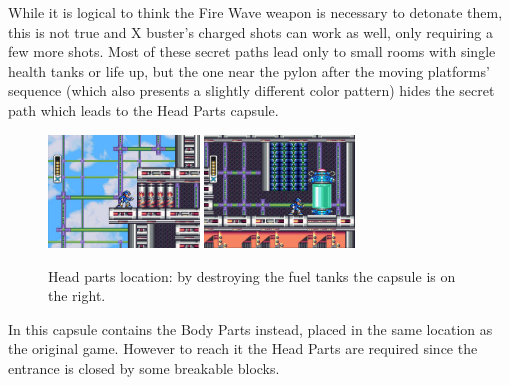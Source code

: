 While it is logical to think the Fire Wave weapon is necessary to detonate them, this is not true and X buster's charged shots can work as well, only requiring a few more shots. Most of these secret paths lead only to small rooms with single health tanks or life up, but the one near the pylon after the moving platforms' sequence (which also presents a slightly different color pattern) hides the  secret path which leads to the Head Parts capsule. 
\begin{figure}[htp]
	\centering
		\includegraphics[height=3cm]{figures/X1/Storm_eagle/Storm_armor_1.jpg}
		\includegraphics[height=3cm]{figures/X1/Storm_eagle/Storm_armor_2.jpg}
	\caption{Head parts location: by destroying the fuel tanks the capsule is on the right.}
\end{figure}
In \mhx this capsule contains the Body Parts instead, placed in the same location as the original game. However to reach it the Head Parts are required since the entrance is closed by some breakable blocks.


